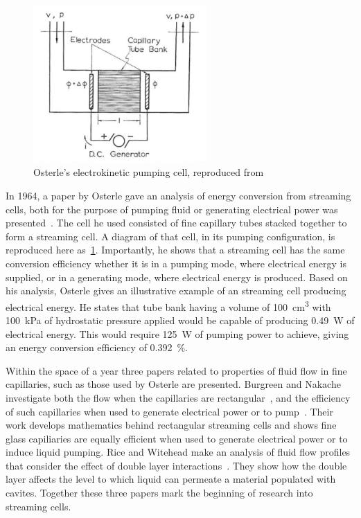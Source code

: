     \begin{figure}
      \centering
      \includegraphics[height=6cm]{content/pt1/Osterle_ElectrokineticCell.png}
      \caption{\label{fig:Osterle_cell}Osterle's electrokinetic pumping cell, reproduced from \cite{Osterle1964}}
    \end{figure}
    In 1964, a paper by Osterle gave an analysis of energy conversion from streaming cells, both for the purpose of pumping fluid or generating electrical power was presented~\cite{Osterle1964}.
    The cell he used consisted of fine capillary tubes stacked together to form a streaming cell.
    A diagram of that cell, in its pumping configuration, is reproduced here as~\cref{fig:Osterle_cell}.
    Importantly, he shows that a streaming cell has the same conversion efficiency whether it is in a pumping mode, where electrical energy is supplied, or in a generating mode, where electrical energy is produced.
    Based on his analysis, Osterle gives an illustrative example of an streaming cell producing electrical energy.
    He states that tube bank having a volume of \SI{100}{\centi\meter\cubed} with \SI{100}{\kilo\pascal} of hydrostatic pressure applied would be capable of producing \SI{0.49}{\watt} of electrical energy.
    This would require \SI{125}{\watt} of pumping power to achieve, giving an energy conversion efficiency of \SI{0.392}{\percent}.

    Within the space of a year three papers related to properties of fluid flow in fine capillaries, such as those used by Osterle are presented.
    Burgreen and Nakache investigate both the flow when the capillaries are rectangular~\cite{Burgreen1964}, and the efficiency of such capillaries when used to generate electrical power or to pump~\cite{Burgreen1965}.
    Their work develops mathematics behind rectangular streaming cells and shows fine glass capiliaries are equally efficient when used to generate electrical power or to induce liquid pumping.
    Rice and Witehead make an analysis of fluid flow profiles that consider the effect of double layer interactions~\cite{Rice1965}.
    They show how the double layer affects the level to which liquid can permeate a material populated with cavites.
    Together these three papers mark the beginning of research into streaming cells.

